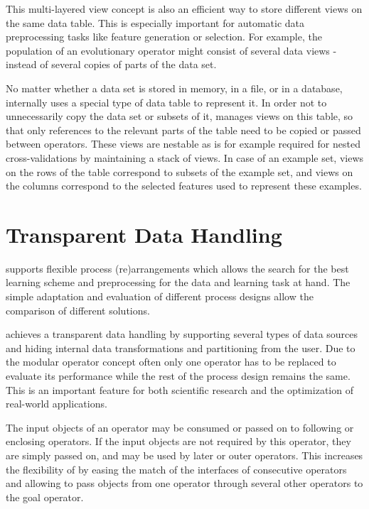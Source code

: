 This multi-layered view concept is also an efficient way to store different
views on the same data table. This is especially important for automatic data
preprocessing tasks like feature generation or selection. For example, the
population of an evolutionary operator might consist of several data views -
instead of several copies of parts of the data set. 
    
No matter whether a data set is stored in memory, in a file,
or in a database, \rapidminer internally uses a special type of data
table to represent it.
   In order not to unnecessarily copy the data set or subsets
of it, \rapidminer manages views on this table, so that only references
to the relevant parts of the table need to be copied or passed
between operators.
   These views are nestable as is for example required for nested
cross-validations by maintaining a stack of views.
   In case of an example set, views on the rows of the table 
correspond to subsets of the example set, and views on the
columns correspond to the selected features used to represent
these examples.




\section{Transparent Data Handling}

\rapidminer supports flexible process (re)arrangements which allows the search
for the best learning scheme and preprocessing for the data and learning task
at hand. The simple adaptation and evaluation of different process designs
allow the comparison of different solutions. 

\rapidminer achieves a transparent data handling by supporting several
types of data sources and hiding internal data transformations and
partitioning from the user. Due to the modular operator
concept often only one operator has to be replaced to evaluate its performance
while the rest of the process design remains the same. This is an important
feature for both scientific research and the optimization of real-world
applications.

The input objects of an operator may be consumed or passed on to 
following or enclosing operators. If the input objects are not required by
this operator, they are simply passed on, and may be used by later or outer 
operators.
This increases the flexibility of \rapidminer by easing the match of 
the interfaces of consecutive operators and allowing to pass objects
from one operator through several other operators to the goal operator.

